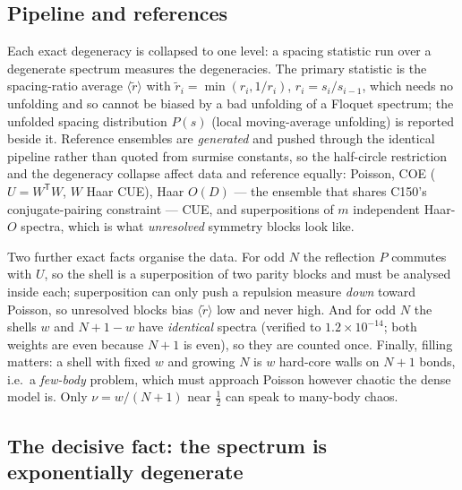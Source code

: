 \documentclass[11pt]{article}
\theoremstyle{plain}
\theoremstyle{definition}
\begin{document}
\subsection{Pipeline and references}

Each exact degeneracy is collapsed to one level: a spacing statistic run over a
degenerate spectrum measures the degeneracies. The primary statistic is the
spacing-ratio average $\langle\tilde r\rangle$ with
$\tilde r_i = \min(r_i, 1/r_i)$, $r_i = s_i/s_{i-1}$, which needs no unfolding
and so cannot be biased by a bad unfolding of a Floquet spectrum; the unfolded
spacing distribution $P(s)$ (local moving-average unfolding) is reported beside
it. Reference ensembles are \emph{generated} and pushed through the identical
pipeline rather than quoted from surmise constants, so the half-circle
restriction and the degeneracy collapse affect data and reference equally:
Poisson, COE ($U = W^{\mathsf T}W$, $W$ Haar CUE), Haar $O(D)$ --- the ensemble
that shares C150's conjugate-pairing constraint --- CUE, and superpositions of
$m$ independent Haar-$O$ spectra, which is what \emph{unresolved} symmetry blocks
look like.

Two further exact facts organise the data. For odd $N$ the reflection $P$
commutes with $U$, so the shell is a superposition of two parity blocks and must
be analysed inside each; superposition can only push a repulsion measure
\emph{down} toward Poisson, so unresolved blocks bias $\langle\tilde r\rangle$
low and never high. And for odd $N$ the shells $w$ and $N+1-w$ have
\emph{identical} spectra (verified to $1.2\times10^{-14}$; both weights are even
because $N+1$ is even), so they are counted once. Finally, filling matters: a
shell with fixed $w$ and growing $N$ is $w$ hard-core walls on $N+1$ bonds, i.e.\
a \emph{few-body} problem, which must approach Poisson however chaotic the dense
model is. Only $\nu = w/(N+1)$ near $\tfrac12$ can speak to many-body chaos.

\subsection{The decisive fact: the spectrum is exponentially degenerate}
\end{document}
